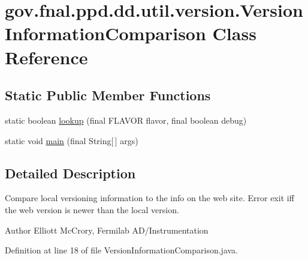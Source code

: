 \hypertarget{classgov_1_1fnal_1_1ppd_1_1dd_1_1util_1_1version_1_1VersionInformationComparison}{\section{gov.\-fnal.\-ppd.\-dd.\-util.\-version.\-Version\-Information\-Comparison Class Reference}
\label{classgov_1_1fnal_1_1ppd_1_1dd_1_1util_1_1version_1_1VersionInformationComparison}
}
\subsection*{Static Public Member Functions}
\begin{DoxyCompactItemize}
\item 
static boolean \hyperlink{classgov_1_1fnal_1_1ppd_1_1dd_1_1util_1_1version_1_1VersionInformationComparison_af1c5f9dd0b50c3fea2a6d7bb08992abb}{lookup} (final F\-L\-A\-V\-O\-R flavor, final boolean debug)
\item 
static void \hyperlink{classgov_1_1fnal_1_1ppd_1_1dd_1_1util_1_1version_1_1VersionInformationComparison_a34491a10aba931aef023f65cc0a63d00}{main} (final String\mbox{[}$\,$\mbox{]} args)
\end{DoxyCompactItemize}


\subsection{Detailed Description}
Compare local versioning information to the info on the web site. Error exit iff the web version is newer than the local version. 

\begin{DoxyAuthor}{Author}
Elliott Mc\-Crory, Fermilab A\-D/\-Instrumentation 
\end{DoxyAuthor}


Definition at line 18 of file Version\-Information\-Comparison.\-java.



